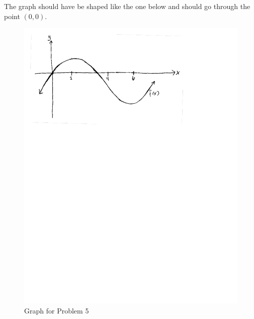 \documentclass{hwset}
\begin{document}
\begin{solution}
	The graph should have be shaped like the one below and should go through the
	point $(0,0)$.
	\begin{figure}[h]
	\begin{center}
	\includegraphics[trim=0.1 6.08in 1.59in 0.3in, clip]{HW11_5.pdf}
  \caption{Graph for Problem 5}
	\end{center}
	\end{figure}
\end{solution}
\end{document}
